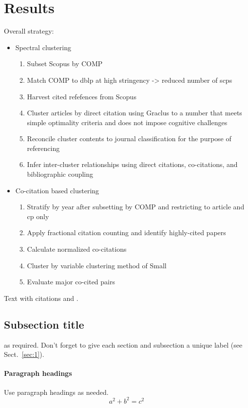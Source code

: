 \section{Results}
\label{sec:2}

Overall strategy:

\begin{itemize}
\item Spectral clustering
\begin{enumerate}
\item Subset Scopus by COMP
\item Match COMP to dblp at high stringency -> reduced number of scps
 \item Harvest cited refefences  from Scopus
 \item Cluster articles by direct citation using Graclus to a number that meets simple optimality criteria and does not impose cognitive challenges
 \item Reconcile cluster contents to journal classification for the purpose of referencing
 \item Infer inter-cluster relationships using direct citations, co-citations, and bibliographic coupling
\end{enumerate}
\item Co-citation based clustering
\begin{enumerate}
\item Stratify by year after subsetting by COMP and restricting to article and cp only
\item Apply fractional citation counting and identify highly-cited papers
\item Calculate normalized co-citations
\item Cluster by variable clustering method of Small
\item Evaluate major co-cited pairs
\end{enumerate}
\end{itemize}


Text with citations \cite{RefB} and \cite{RefJ}.

\subsection{Subsection title}
\label{sec:2}
as required. Don't forget to give each section
and subsection a unique label (see Sect.~\ref{sec:1}).
\paragraph{Paragraph headings} Use paragraph headings as needed.
\begin{equation}
a^2+b^2=c^2
\end{equation}

